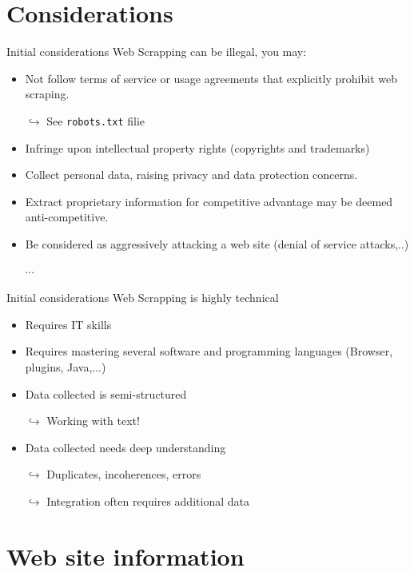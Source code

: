 \documentclass[xcolor=x11names, aspectratio=169, compress]{beamer}
\renewcommand{\(}{\begin{columns}}
\renewcommand{\)}{\end{columns}}
\newcommand{\<}[1]{\begin{column}{#1}}
\renewcommand{\>}{\end{column}}
\begin{document}
\section{Considerations}


\begin{frame}{Initial considerations}
Web Scrapping can be illegal, you may:
\pause
\begin{itemize}[<+->]
    \item Not follow terms of service or usage agreements that explicitly prohibit web scraping.
    \item[$\hookrightarrow$] See \texttt{robots.txt} filie
    \item Infringe upon intellectual property rights (copyrights and trademarks)
    \item Collect personal data, raising privacy and data protection concerns.
    \item Extract proprietary information for competitive advantage may be deemed anti-competitive.
    \item Be considered as aggressively attacking a web site  (denial of service attacks,..)
    \item[$\cdots$]
\end{itemize}
\end{frame}

\begin{frame}{Initial considerations}
Web Scrapping is highly technical
\pause
\begin{itemize}[<+->]
    \item Requires IT skills
    \item Requires mastering several software  and programming languages (Browser, plugins, Java,...)
    \item Data collected is semi-structured
    \item[$\hookrightarrow$]  Working with text!
    \item Data collected needs deep understanding
    \item[$\hookrightarrow$]  Duplicates, incoherences, errors
    \item[$\hookrightarrow$ ] Integration often requires additional data
\end{itemize}
\end{frame}

\section{Web site information}
\end{document}
